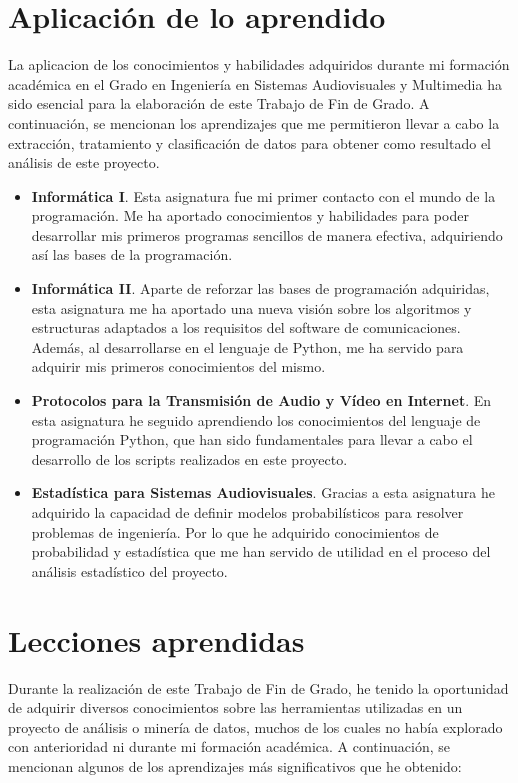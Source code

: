 \documentclass[a4paper, 12pt]{book}
\begin{document}
\section{Aplicación de lo aprendido}
\label{sec:aplicacion}

La aplicacion de los conocimientos y habilidades adquiridos durante mi formación académica en el Grado en Ingeniería en Sistemas Audiovisuales y Multimedia ha sido esencial para
la elaboración de este Trabajo de Fin de Grado. A continuación, se mencionan los aprendizajes que me permitieron llevar a cabo la extracción, tratamiento y clasificación de datos
para obtener como resultado el análisis de este proyecto.

\begin{itemize}
  \item \textbf{Informática I}. Esta asignatura fue mi primer contacto con el mundo de la programación. Me ha aportado conocimientos y habilidades para poder desarrollar mis primeros
  programas sencillos de manera efectiva, adquiriendo así las bases de la programación. 
  \item \textbf{Informática II}. Aparte de reforzar las bases de programación adquiridas, esta asignatura me ha aportado una nueva visión sobre los algoritmos y estructuras adaptados
  a los requisitos del software de comunicaciones. Además, al desarrollarse en el lenguaje de Python, me ha servido para adquirir mis primeros conocimientos del mismo.
  \item \textbf{Protocolos para la Transmisión de Audio y Vídeo en Internet}. En esta asignatura he seguido aprendiendo los conocimientos del lenguaje de programación Python, que han sido
  fundamentales para llevar a cabo el desarrollo de los scripts realizados en este proyecto. 
  \item \textbf{Estadística para Sistemas Audiovisuales}. Gracias a esta asignatura he adquirido la capacidad de definir modelos probabilísticos para resolver problemas de ingeniería.
  Por lo que he adquirido conocimientos de probabilidad y estadística que me han servido de utilidad en el proceso del análisis estadístico del proyecto.
\end{itemize}

\section{Lecciones aprendidas}
\label{sec:lecciones_aprendidas}

Durante la realización de este Trabajo de Fin de Grado, he tenido la oportunidad de adquirir diversos conocimientos sobre las herramientas utilizadas en un proyecto de análisis o minería
de datos, muchos de los cuales no había explorado con anterioridad ni durante mi formación académica. A continuación, se mencionan algunos de los aprendizajes más significativos que he
obtenido:
\end{document}
